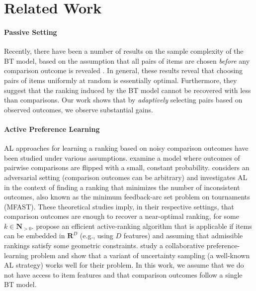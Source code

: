 \section{Related Work}  %
\label{rs:sec:relwork}

\paragraph{Passive Setting}
Recently, there have been a number of results on the sample complexity of the BT model, based on the assumption that all pairs of items are chosen \emph{before} any comparison outcome is revealed
\citep{negahban2012iterative, hajek2014minimax, rajkumar2014statistical, vojnovic2016parameter}.
In general, these results reveal that choosing pairs of items uniformly at random is essentially optimal.
Furthermore, they suggest that the ranking induced by the BT model cannot be recovered with less than  comparisons.
Our work shows that by \emph{adaptively} selecting pairs based on observed outcomes, we observe substantial gains.

\paragraph{Active Preference Learning}
AL approaches for learning a ranking based on noisy comparison outcomes have been studied under various assumptions.
\citet{braverman2008noisy} examine a model where outcomes of pairwise comparisons are flipped with a small, constant probability.
\citet{ailon2012active} considers an adversarial setting (comparison outcomes can be arbitrary) and investigates AL in the context of finding a ranking that minimizes the number of inconsistent outcomes, also known as the minimum feedback-arc set problem on tournaments (MFAST).
These theoretical studies imply, in their respective settings, that  comparison outcomes are enough to recover a near-optimal ranking, for some $k \in \mathbf{N}_{>0}$.
\citet{jamieson2011active} propose an efficient active-ranking algorithm that is applicable if items can be embedded in $\mathbf{R}^D$ (e.g., using $D$ features) and assuming that admissible rankings satisfy some geometric constraints.
\citet{wang2014active} study a collaborative preference-learning problem and show that a variant of uncertainty sampling (a well-known AL strategy) works well for their problem.
In this work, we assume that we do not have access to item features and that comparison outcomes follow a single BT model.

